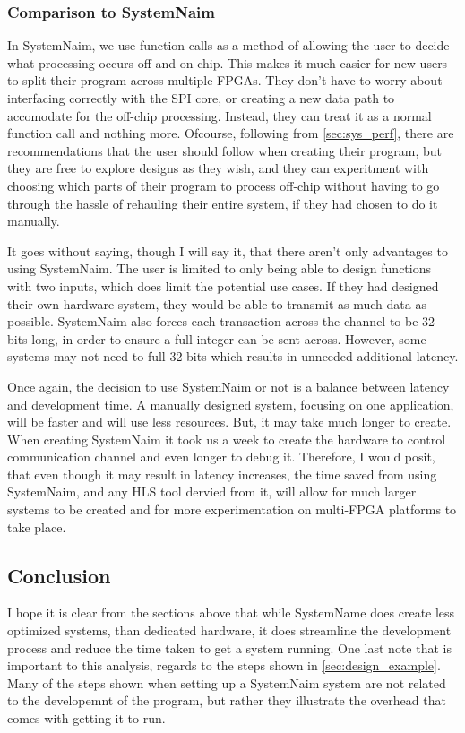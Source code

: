 \subsubsection{Comparison to SystemNaim}

In SystemNaim, we use function calls as a method of allowing the user to decide what processing occurs off and on-chip. This makes it much easier for new users to split their program across multiple FPGAs. They don't have to worry about interfacing correctly with the SPI core, or creating a new data path to accomodate for the off-chip processing. Instead, they can treat it as a normal function call and nothing more. Ofcourse, following from \autoref{sec:sys_perf}, there are recommendations that the user should follow when creating their program, but they are free to explore designs as they wish, and they can experitment with choosing which parts of their program to process off-chip without having to go through the hassle of rehauling their entire system, if they had chosen to do it manually.

It goes without saying, though I will say it, that there aren't only advantages to using SystemNaim. The user is limited to only being able to design functions with two inputs, which does limit the potential use cases. If they had designed their own hardware system, they would be able to transmit as much data as possible. SystemNaim also forces each transaction across the channel to be 32 bits long, in order to ensure a full integer can be sent across. However, some systems may not need to full 32 bits which results in unneeded additional latency.

Once again, the decision to use SystemNaim or not is a balance between latency and development time. A manually designed system, focusing on one application, will be faster and will use less resources. But, it may take much longer to create. When creating SystemNaim it took us a week to create the hardware to control communication channel and even longer to debug it. Therefore, I would posit, that even though it may result in latency increases, the time saved from using SystemNaim, and any HLS tool dervied from it, will allow for much larger systems to be created and for more experimentation on multi-FPGA platforms to take place.

\subsection{Conclusion}

I hope it is clear from the sections above that while SystemName does create less optimized systems, than dedicated hardware, it does streamline the development process and reduce the time taken to get a system running. One last note that is important to this analysis, regards to the steps shown in \autoref{sec:design_example}. Many of the steps shown when setting up a SystemNaim system are not related to the developemnt of the program, but rather they illustrate the overhead that comes with getting it to run. 

